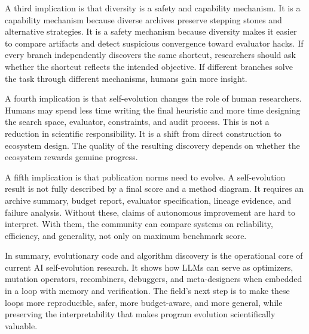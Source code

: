 A third implication is that diversity is a safety and capability mechanism.  It is a capability mechanism because diverse archives preserve stepping stones and alternative strategies.  It is a safety mechanism because diversity makes it easier to compare artifacts and detect suspicious convergence toward evaluator hacks.  If every branch independently discovers the same shortcut, researchers should ask whether the shortcut reflects the intended objective.  If different branches solve the task through different mechanisms, humans gain more insight.

A fourth implication is that self-evolution changes the role of human researchers.  Humans may spend less time writing the final heuristic and more time designing the search space, evaluator, constraints, and audit process.  This is not a reduction in scientific responsibility.  It is a shift from direct construction to ecosystem design.  The quality of the resulting discovery depends on whether the ecosystem rewards genuine progress.

A fifth implication is that publication norms need to evolve.  A self-evolution result is not fully described by a final score and a method diagram.  It requires an archive summary, budget report, evaluator specification, lineage evidence, and failure analysis.  Without these, claims of autonomous improvement are hard to interpret.  With them, the community can compare systems on reliability, efficiency, and generality, not only on maximum benchmark score.

In summary, evolutionary code and algorithm discovery is the operational core of current AI self-evolution research.  It shows how LLMs can serve as optimizers, mutation operators, recombiners, debuggers, and meta-designers when embedded in a loop with memory and verification.  The field's next step is to make these loops more reproducible, safer, more budget-aware, and more general, while preserving the interpretability that makes program evolution scientifically valuable.
